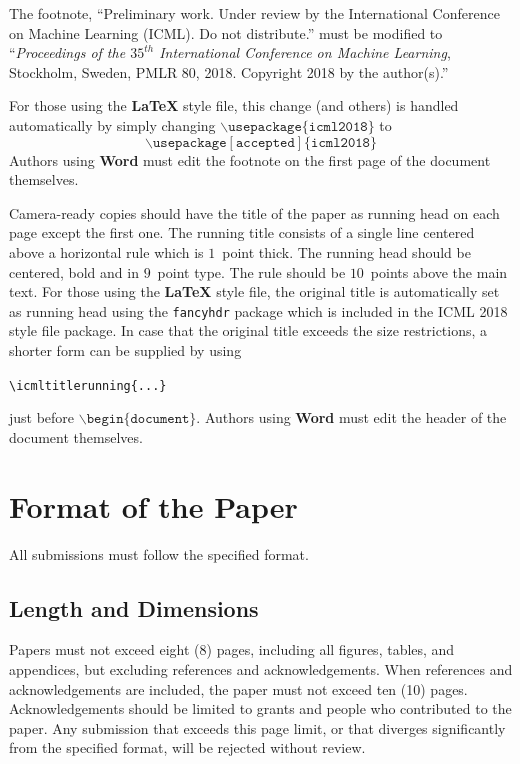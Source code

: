 \documentclass{article}
\begin{document}
The footnote, ``Preliminary work. Under review by the International
Conference on Machine Learning (ICML). Do not distribute.'' must be
modified to ``\textit{Proceedings of the
$\mathit{35}^{th}$ International Conference on Machine Learning},
Stockholm, Sweden, PMLR 80, 2018.
Copyright 2018 by the author(s).''

For those using the \textbf{\LaTeX} style file, this change (and others) is
handled automatically by simply changing
$\mathtt{\backslash usepackage\{icml2018\}}$ to
$$\mathtt{\backslash usepackage[accepted]\{icml2018\}}$$
Authors using \textbf{Word} must edit the
footnote on the first page of the document themselves.

Camera-ready copies should have the title of the paper as running head
on each page except the first one. The running title consists of a
single line centered above a horizontal rule which is $1$~point thick.
The running head should be centered, bold and in $9$~point type. The
rule should be $10$~points above the main text. For those using the
\textbf{\LaTeX} style file, the original title is automatically set as running
head using the \texttt{fancyhdr} package which is included in the ICML
2018 style file package. In case that the original title exceeds the
size restrictions, a shorter form can be supplied by using

\verb|\icmltitlerunning{...}|

just before $\mathtt{\backslash begin\{document\}}$.
Authors using \textbf{Word} must edit the header of the document themselves.

\section{Format of the Paper}

All submissions must follow the specified format.

\subsection{Length and Dimensions}

Papers must not exceed eight (8) pages, including all figures, tables,
and appendices, but excluding references and acknowledgements. When references and acknowledgements are included,
the paper must not exceed ten (10) pages.
Acknowledgements should be limited to grants and people who contributed to the paper.
Any submission that exceeds
this page limit, or that diverges significantly from the specified format,
will be rejected without review.
\end{document}
